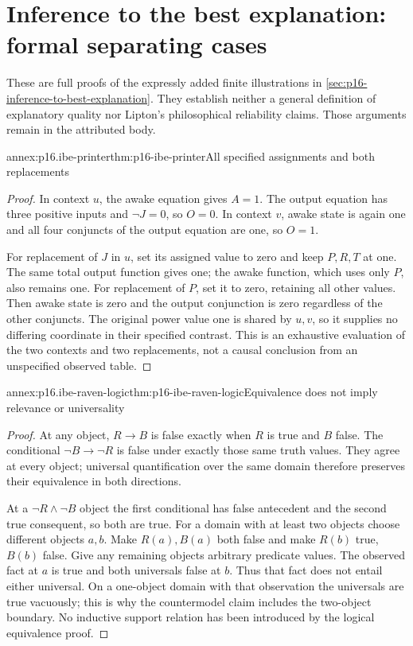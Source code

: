 \section{Inference to the best explanation: formal separating cases}
\label{sec:annex-p16-inference-to-best-explanation}

These are full proofs of the expressly added finite illustrations in
\cref{sec:p16-inference-to-best-explanation}. They establish neither a
general definition of explanatory quality nor Lipton's philosophical
reliability claims. Those arguments remain in the attributed body.

\begin{annexitem}{annex:p16.ibe-printer}{thm:p16-ibe-printer}{All specified assignments and both replacements}
\begin{proof}
In context \(u\), the awake equation gives \(A=1\). The output
equation has three positive inputs and \(\neg J=0\), so \(O=0\).
In context \(v\), awake state is again one and all four conjuncts of
the output equation are one, so \(O=1\).

For replacement of \(J\) in \(u\), set its assigned value to zero
and keep \(P,R,T\) at one. The same total output function gives one;
the awake function, which uses only \(P\), also remains one. For
replacement of \(P\), set it to zero, retaining all other values.
Then awake state is zero and the output conjunction is zero regardless
of the other conjuncts. The original power value one is shared by
\(u,v\), so it supplies no differing coordinate in their specified
contrast. This is an exhaustive evaluation of the two contexts and two
replacements, not a causal conclusion from an unspecified observed table.
\end{proof}
\end{annexitem}

\begin{annexitem}{annex:p16.ibe-raven-logic}{thm:p16-ibe-raven-logic}{Equivalence does not imply relevance or universality}
\begin{proof}
At any object, \(R\to B\) is false exactly when \(R\) is true
and \(B\) false. The conditional \(\neg B\to\neg R\) is false
under exactly those same truth values. They agree at every object;
universal quantification over the same domain therefore preserves their
equivalence in both directions.

At a \(\neg R\land\neg B\) object the first conditional has false
antecedent and the second true consequent, so both are true. For a domain
with at least two objects choose different objects \(a,b\). Make
\(R(a),B(a)\) both false and make \(R(b)\) true, \(B(b)\) false.
Give any remaining objects arbitrary predicate values. The observed fact
at \(a\) is true and both universals false at \(b\). Thus that fact
does not entail either universal. On a one-object domain with that
observation the universals are true vacuously; this is why the countermodel
claim includes the two-object boundary. No inductive support relation has
been introduced by the logical equivalence proof.
\end{proof}
\end{annexitem}

